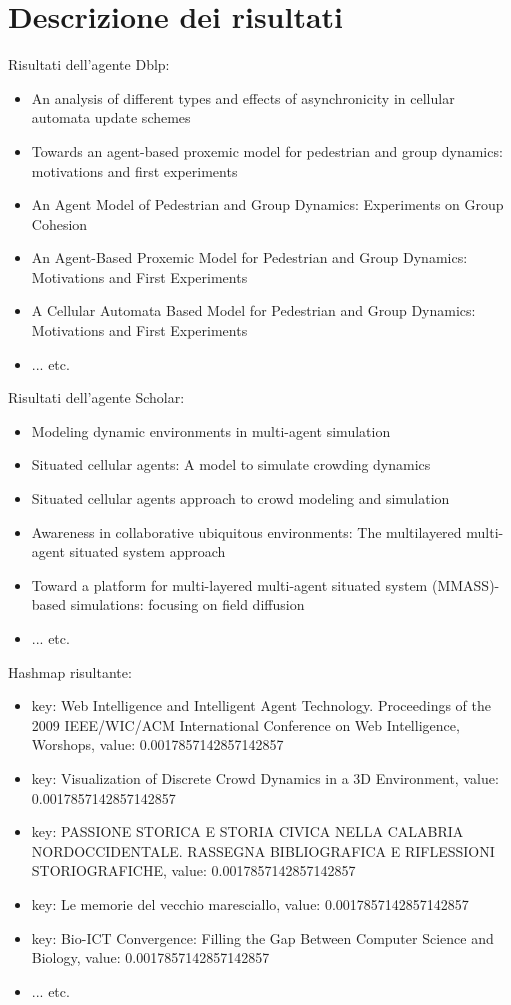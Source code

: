 \documentclass[12pt]{article}
\begin{document}
\section{Descrizione dei risultati}

Risultati dell'agente Dblp:
\begin{itemize}
\item An analysis of different types and effects of asynchronicity in cellular automata update schemes
\item Towards an agent-based proxemic model for pedestrian and group dynamics: motivations and first experiments
\item An Agent Model of Pedestrian and Group Dynamics: Experiments on Group Cohesion
\item An Agent-Based Proxemic Model for Pedestrian and Group Dynamics: Motivations and First Experiments
\item A Cellular Automata Based Model for Pedestrian and Group Dynamics: Motivations and First Experiments
\item ... etc.
\end{itemize}
Risultati dell'agente Scholar:
\begin{itemize}
\item Modeling dynamic environments in multi-agent simulation
\item Situated cellular agents: A model to simulate crowding dynamics
\item Situated cellular agents approach to crowd modeling and simulation
\item Awareness in collaborative ubiquitous environments: The multilayered multi-agent situated system approach
\item Toward a platform for multi-layered multi-agent situated system (MMASS)-based simulations: focusing on field diffusion
\item ... etc.
\end{itemize}
Hashmap risultante:
\begin{itemize}
\item key: Web Intelligence and Intelligent Agent Technology. Proceedings of the 2009 IEEE/WIC/ACM International Conference on Web Intelligence, Worshops, value: 0.0017857142857142857
\item key: Visualization of Discrete Crowd Dynamics in a 3D Environment, value: 0.0017857142857142857
\item key: PASSIONE STORICA E STORIA CIVICA NELLA CALABRIA NORDOCCIDENTALE. RASSEGNA BIBLIOGRAFICA E RIFLESSIONI STORIOGRAFICHE, value: 0.0017857142857142857
\item key: Le memorie del vecchio maresciallo, value: 0.0017857142857142857
\item key: Bio-ICT Convergence: Filling the Gap Between Computer Science and Biology, value: 0.0017857142857142857
\item ... etc.
\end{itemize}
\end{document}
